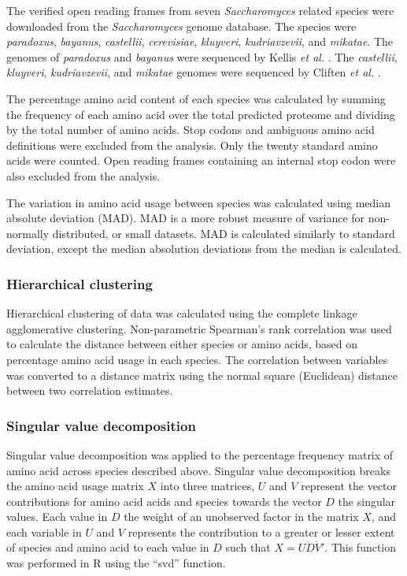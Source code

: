 The verified open reading frames from seven \emph{Saccharomyces} related species were downloaded from the \emph{Saccharomyces} genome database. The species were \emph{paradoxus}, \emph{bayanus}, \emph{castellii}, \emph{cerevisiae}, \emph{kluyveri}, \emph{kudriavzevii}, and \emph{mikatae}. The genomes of \emph{paradoxus} and \emph{bayanus} were sequenced by Kellis \emph{et al.} \cite{kellis2003}. The \emph{castellii}, \emph{kluyveri}, \emph{kudriavzevii}, and \emph{mikatae} genomes were sequenced by Cliften \emph{et al.} \cite{cliften2003}.

The percentage amino acid content of each species was calculated by summing the frequency of each amino acid over the total predicted proteome and dividing by the total number of amino acids. Stop codons and ambiguous amino acid definitions were excluded from the analysis. Only the twenty standard amino acids were counted. Open reading frames containing an internal stop codon were also excluded from the analysis.

The variation in amino acid usage between species was calculated using median absolute deviation (MAD). MAD is a more robust measure of variance for non-normally distributed, or small datasets. MAD is calculated similarly to standard deviation, except the median absolution deviations from the median is calculated.

\subsubsection{Hierarchical clustering}

Hierarchical clustering of data was calculated using the complete linkage agglomerative clustering. Non-parametric Spearman's rank correlation was used to calculate the distance between either species or amino acids, based on percentage amino acid usage in each species. The correlation between variables was converted to a distance matrix using the normal square (Euclidean) distance between two correlation estimates.

\subsubsection{Singular value decomposition}
 
Singular value decomposition was applied to the percentage frequency matrix of amino acid across species described above. Singular value decomposition breaks the amino acid usage matrix $X$ into three matrices, $U$ and $V$ represent the vector contributions for amino acid acids and species towards the vector $D$ the singular values. Each value in $D$ the weight of an unobserved factor in the matrix $X$, and each variable in $U$ and $V$  represents the contribution to a greater or lesser extent of species and amino acid to each value in $D$ such that $X = U \dot D \dot V'$. This function was performed in R using the ``svd'' function.

